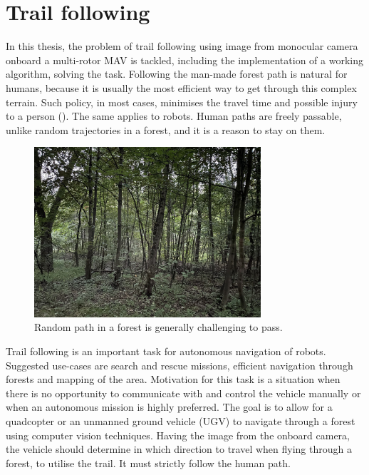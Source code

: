 \section{Trail following}

In this thesis, the problem of trail following using image from monocular camera onboard a multi-rotor \acs{MAV} is tackled, including the implementation of a working algorithm, solving the task. Following the man-made forest path is natural for humans, because it is usually the most efficient way to get through this complex terrain. Such policy, in most cases, minimises the travel time and possible injury to a person (). The same applies to robots. Human paths are freely passable, unlike random trajectories in a forest, and it is a reason to stay on them.

\begin{figure}[!h]
  \centering
  \includegraphics[width=0.75\textwidth]{./fig/photos/challenging_path.jpg}

  \caption{Random path in a forest is generally challenging to pass.}
  \label{fig:challenging_path}
\end{figure}

Trail following is an important task for autonomous navigation of robots. Suggested use-cases are search and rescue missions, efficient navigation through forests and mapping of the area. Motivation for this task is a situation when there is no opportunity to communicate with and control the vehicle manually or when an autonomous mission is highly preferred. The goal is to allow for a quadcopter or an unmanned ground vehicle (UGV) to navigate through a forest using computer vision techniques. Having the image from the onboard camera, the vehicle should determine in which direction to travel when flying through a forest, to utilise the trail. It must strictly follow the human path.

